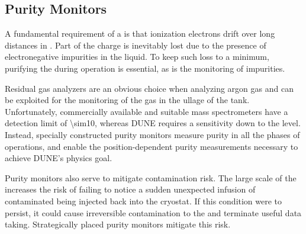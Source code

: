 \subsection{Purity Monitors} 
\label{sec:fdgen-slow-cryo-purity-mon}
\label{sec:fdsp-slow-cryo-purity-mon} %
\label{sec:fddp-slow-cryo-purity-mon} %
A fundamental requirement of a   is that ionization electrons drift over long distances in . Part of the charge is inevitably lost due to the presence of electronegative impurities in the liquid. To keep such loss to a minimum, purifying the  during operation is essential, as is the monitoring of impurities.

Residual gas analyzers are an obvious choice when analyzing argon gas and can be exploited for the monitoring of the gas in the ullage of the tank. Unfortunately, commercially available and suitable mass spectrometers have a detection limit of \num{\sim10}, whereas DUNE requires a sensitivity down to the  level. Instead, specially constructed purity monitors measure \lar purity in all the phases of operations, and enable the position-dependent purity measurements necessary to achieve DUNE's physics goal. 

Purity monitors also serve to mitigate \lar contamination risk.  %
The large scale of the  increases the risk of failing to notice a sudden unexpected infusion of contaminated \lar being injected back into the cryostat.   
If this condition were to persist, it could cause irreversible contamination to the  and terminate useful data taking.  Strategically placed purity monitors mitigate this risk. 

